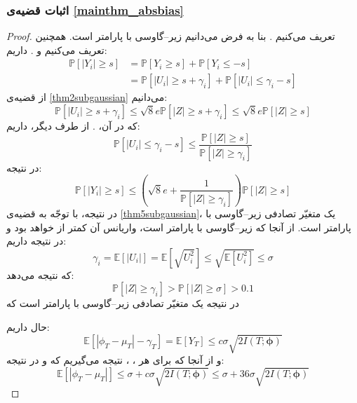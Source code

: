 \documentclass[a4paper,12pt]{article}
\newcommand{\E}{\mathbb{E}}
\newcommand{\Prob}{\mathbb{P}}
\newcommand{\bfphi}{\bm {\phi}}
\newcommand{\Nd}{\mathcal{N}}
\begin{document}
	\subsubsection{اثبات قضیه‌ی
		\eqref{mainthm_absbias}}
	\begin{proof}
		تعریف می‌کنیم
		.
		بنا به فرض می‌دانیم
		زیر--گاوسی با پارامتر
		\lr{$\sigma$}
		است. همچنین تعریف می‌کنیم
		\lr{$\gamma_i = \E[|U_i|] = \E[|\phi_i-\mu_i|]$}
		و
		.
		داریم:
		\begin{align}
		\Prob[|Y_i|\geq s] &= \Prob[Y_i\geq s] + \Prob[Y_i\leq -s]\\
		&= \Prob[|U_i|\geq s + \gamma_i] + \Prob[|U_i|\leq \gamma_i - s]
		\end{align}
		از قضیه‌ی
		\eqref{thm2subgaussian}
		می‌دانیم:
		\begin{equation}
		\Prob[|U_i|\geq s + \gamma_i] \leq \sqrt{8}e\Prob[|Z|\geq s+\gamma_i] \leq \sqrt{8}e\Prob[|Z|\geq s]
		\end{equation}
		که در آن،
		\lr{$Z\sim \Nd(0,2\sigma^2)$}.
		از طرف دیگر، داریم:
		\begin{equation}
		\Prob[|U_i|\leq \gamma_i - s] \leq \frac{\Prob[|Z|\geq s]}{\Prob[|Z|\geq \gamma_i]}
		\end{equation}
		در نتیجه:
		\begin{equation}
		\Prob[|Y_i|\geq s] \leq \left(\sqrt{8}e + \frac{1}{\Prob[|Z|\geq \gamma_i]}\right)\Prob[|Z|\geq s]
		\end{equation}
		در نتیجه، با توجّه به قضیه‌ی
		\eqref{thm5subgaussian}،
		یک متغیّر تصادفی زیر--گاوسی با پارامتر
		\lr{$2\sigma\left(\sqrt{8}e + \frac{1}{\Prob[|Z|\geq \gamma_i]}\right)$}
		است. از آنجا که
		زیر--گاوسی با پارامتر
		\lr{$\sigma$}
		است، واریانس آن کمتر از 
		خواهد بود و در نتیجه داریم:
		\[\gamma_i = \E[|U_i|] = \E[\sqrt{U_i^2}]\leq\sqrt{\E[U_i^2]}\leq \sigma\]
		که نتیجه می‌دهد:
		\begin{equation}
		\Prob[|Z|\geq \gamma_i] > \Prob[|Z|\geq \sigma]>0.1
		\end{equation}
		در نتیجه 
		یک متغیّر تصادفی زیر--گاوسی با پارامتر
		است که 
		
		حال داریم:
		\begin{equation}
		\E[|\phi_T-\mu_T|-\gamma_T] = \E[Y_T] \leq c\sigma \sqrt{2I(T;\bfphi)}
		\end{equation}
		و از آنجا که برای هر
		،
		،
		نتیجه می‌گیریم که
		و در نتیجه:
		\begin{equation}
		\E[|\phi_T-\mu_T|]\leq \sigma + c\sigma\sqrt{2I(T;\bfphi)} \leq \sigma + 36\sigma\sqrt{2I(T;\bfphi)}
		\end{equation}
	\end{proof}
\end{document}
